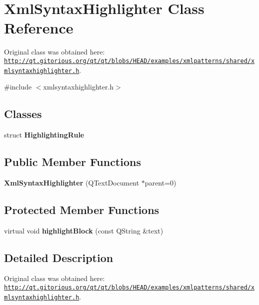\hypertarget{class_xml_syntax_highlighter}{\section{\-Xml\-Syntax\-Highlighter \-Class \-Reference}
\label{class_xml_syntax_highlighter}
}


\-Original class was obtained here\-: \href{http://qt.gitorious.org/qt/qt/blobs/HEAD/examples/xmlpatterns/shared/xmlsyntaxhighlighter.h}{\tt http\-://qt.\-gitorious.\-org/qt/qt/blobs/\-H\-E\-A\-D/examples/xmlpatterns/shared/xmlsyntaxhighlighter.\-h}.  




{\ttfamily \#include $<$xmlsyntaxhighlighter.\-h$>$}

\subsection*{\-Classes}
\begin{DoxyCompactItemize}
\item 
struct {\bfseries \-Highlighting\-Rule}
\end{DoxyCompactItemize}
\subsection*{\-Public \-Member \-Functions}
\begin{DoxyCompactItemize}
\item 
\hypertarget{class_xml_syntax_highlighter_a5217c25d000e2acebcc4eb47b41fd22b}{{\bfseries \-Xml\-Syntax\-Highlighter} (\-Q\-Text\-Document $\ast$parent=0)}\label{class_xml_syntax_highlighter_a5217c25d000e2acebcc4eb47b41fd22b}

\end{DoxyCompactItemize}
\subsection*{\-Protected \-Member \-Functions}
\begin{DoxyCompactItemize}
\item 
\hypertarget{class_xml_syntax_highlighter_a04ad665597f29fd32bff4a8134304460}{virtual void {\bfseries highlight\-Block} (const \-Q\-String \&text)}\label{class_xml_syntax_highlighter_a04ad665597f29fd32bff4a8134304460}

\end{DoxyCompactItemize}


\subsection{\-Detailed \-Description}
\-Original class was obtained here\-: \href{http://qt.gitorious.org/qt/qt/blobs/HEAD/examples/xmlpatterns/shared/xmlsyntaxhighlighter.h}{\tt http\-://qt.\-gitorious.\-org/qt/qt/blobs/\-H\-E\-A\-D/examples/xmlpatterns/shared/xmlsyntaxhighlighter.\-h}. 

